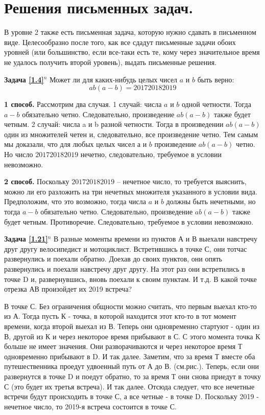 
\section{Решения письменных задач.}

В уровне 2 также есть письменная задача, которую нужно сдавать в письменном виде. Целесообразно после того, как все сдадут письменные задачи обоих уровней (или большинство, если все-таки  есть те, кому через значительное время не удалось получить второй уровень), выдать письменные решения. 



\textbf{Задача \ref{1.4}}$^n$ Может ли для каких-нибудь целых чисел $a$ и $b$ быть верно:    $$ab(a-b) = 201720182019$$

\begin{prf}
	\textbf{1 способ.} Рассмотрим два случая. 1 случай: числа $a$ и $b$ одной четности. Тогда $a - b$ обязательно четно. Следовательно, произведение $ab(a-b)$ также будет четным. 2 случай: числа a и b разной четности. Тогда в произведении $ab(a-b)$ один из множителей четен и, следовательно, все произведение четно. Тем самым мы доказали, что для любых целых чисел $ а $ и $ b $ произведение $ab(a-b)$ четно. Но число $ 201720182019 $ нечетно, следовательно, требуемое в условии невозможно.
	
	\textbf{2 способ.} Поскольку $ 201720182019 $ -- нечетное число, то требуется выяснить, можно ли его разложить на три нечетных множителя указанного в условии вида. Предположим, что это возможно, тогда числа $a$ и $b$ должны быть нечетными, но тогда $a - b$ обязательно четно. Следовательно, произведение $ab(a-b)$ также будет четным. Противоречие. Следовательно, требуемое в условии невозможно.
\end{prf}

\textbf{Задача \ref{1.21}}$^n$
	В разные моменты времени из пунктов А и В выехали навстречу друг другу велосипедист и мотоциклист. Встретившись в точке С, они тотчас развернулись и поехали обратно. Доехав до своих пунктов, они опять развернулись и поехали навстречу друг другу. На этот раз они встретились в точке D и, развернувшись, вновь поехали к своим пунктам. И т.д. В какой точке отрезка АВ произойдет их 2019 встреча?

\begin{prf}
	В точке С. 
	Без ограничения общности можно считать, что первым выехал кто-то из А. Тогда пусть К - точка, в которой находится этот кто-то в тот момент времени, когда второй выехал из В. Теперь они одновременно стартуют - один из В, другой из К и через некоторое время прибывают в С. С этого момента точка К больше не имеет значения. Они разворачиваются и через некоторое время Т одновременно прибывают в D. И так далее. Заметим, что за время Т вместе оба путешественника проедут удвоенный путь от А до В. (см.рис.). Теперь, если они развернутся в точке D и поедут обратно, то за время Т они снова приедут в точку С (это будет их третья встреча). И так далее. Отсюда следует, что все нечетные встречи будут происходить в точке С, а все четные - в точке D. Поскольку 2019 - нечетное число, то 2019-я встреча состоится в точке С.
\end{prf}

